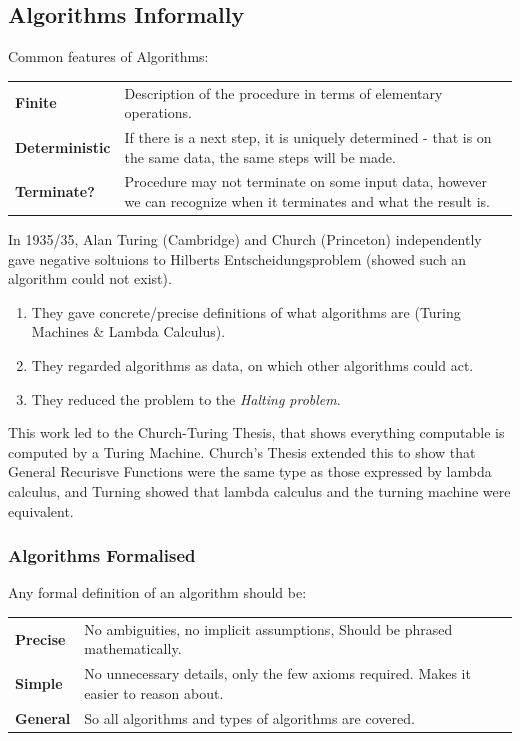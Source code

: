\subsection{Algorithms Informally}
Common features of Algorithms:
\begin{center}
    \begin{tabular}{l p{}}
        \textbf{Finite} & Description of the procedure in terms of elementary operations. \\
        \textbf{Deterministic} & If there is a next step, it is uniquely determined - that is on the same data, the same steps will be made. \\
        \textbf{Terminate?} & Procedure may not terminate on some input data, however we can recognize when it terminates and what the result is. \\
    \end{tabular}
\end{center}
\noindent
In 1935/35, Alan Turing (Cambridge) and Church (Princeton) independently gave negative soltuions to Hilberts Entscheidungsproblem (showed such an algorithm could not exist).
\begin{enumerate}
	\item They gave concrete/precise definitions of what algorithms are (Turing Machines \& Lambda Calculus).
	\item They regarded algorithms as data, on which other algorithms could act.
	\item They reduced the problem to the \textit{Halting problem}.
\end{enumerate}
This work led to the Church-Turing Thesis, that shows everything computable is computed by a Turing Machine. Church's Thesis extended this to show that General Recurisve Functions were the same type as those expressed by lambda calculus, and Turning showed that lambda calculus and the turning machine were equivalent.

\subsubsection{Algorithms Formalised}
Any formal definition of an algorithm should be:
\begin{center}
    \begin{tabular}{l p{}}
        \textbf{Precise} & No ambiguities, no implicit assumptions, Should be phrased mathematically. \\
        \textbf{Simple} & No unnecessary details, only the few axioms required. Makes it easier to reason about. \\
        \textbf{General} & So all algorithms and types of algorithms are covered. \\
    \end{tabular}
\end{center}

